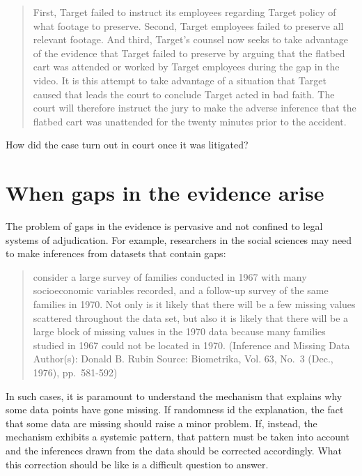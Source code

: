 \documentclass[
  10pt,
  dvipsnames,enabledeprecatedfontcommands]{scrartcl}
\begin{document}
\begin{quote}
First, Target failed to instruct its employees regarding Target policy of what footage to preserve. Second, Target employees failed to preserve all relevant footage. And third, Target’s counsel now seeks to take advantage of the evidence that Target failed to preserve by arguing that the flatbed cart was attended or worked by Target employees during the gap in the video. It is this attempt to take advantage of a situation that Target caused that leads the court to conclude Target acted in bad faith. The court will therefore instruct the jury to make the adverse inference that the flatbed cart was unattended for the twenty minutes prior to the accident.
\end{quote}

How did the case turn out in court once it was litigated?

\hypertarget{when-gaps-in-the-evidence-arise}{%
\section{When gaps in the evidence
arise}\label{when-gaps-in-the-evidence-arise}}

The problem of gaps in the evidence is pervasive and not confined to
legal systems of adjudication. For example, researchers in the social
sciences may need to make inferences from datasets that contain gaps:

\begin{quote}
consider a large survey of families conducted in 1967 with many
socioeconomic variables recorded, and a follow-up survey of the same
families in 1970. Not only is it likely that there will be a few missing
values scattered throughout the data set, but also it is likely that
there will be a large block of missing values in the 1970 data because
many families studied in 1967 could not be located in 1970. (Inference
and Missing Data Author(s): Donald B. Rubin Source: Biometrika, Vol. 63,
No.~3 (Dec., 1976), pp.~581-592)
\end{quote}

In such cases, it is paramount to understand the mechanism that explains
why some data points have gone missing. If randomness id the
explanation, the fact that some data are missing should raise a minor
problem. If, instead, the mechanism exhibits a systemic pattern, that
pattern must be taken into account and the inferences drawn from the
data should be corrected accordingly. What this correction should be
like is a difficult question to answer.
\end{document}
